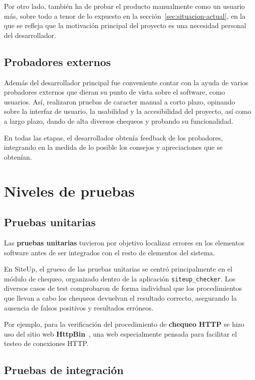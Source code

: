 Por otro lado, también ha de probar el producto manualmente como un usuario más,
sobre todo a tenor de lo expuesto en la sección~\ref{sec:situacion-actual}, en
la que se refleja que la motivación principal del proyecto es una necesidad
personal del desarrollador.

\subsection{Probadores externos}

Además del desarrollador principal fue conveniente contar con la ayuda de varios
probadores externos que dieran su punto de vista sobre el software, como
usuarios. Así, realizaron pruebas de caracter manual a corto plazo, opinando
sobre la interfaz de usuario, la usabilidad y la accesibilidad del proyecto, así
como a largo plazo, dando de alta diversos chequeos y probando su funcionalidad.

En todas las etapas, el desarrollador obtenía feedback de los probadores,
integrando en la medida de lo posible los consejos y apreciaciones que se obtenían.


\section{Niveles de pruebas}

\subsection{Pruebas unitarias}
Las \textbf{pruebas unitarias} tuvieron por objetivo localizar errores en los
elementos software antes de ser integrados con el resto de elementos del sistema.

En SiteUp, el grueso de las pruebas unitarias se centró principalmente en el
módulo de chequeo, organizado dentro de la aplicación
\texttt{siteup\_checker}. Los diversos casos de test comprobaron de forma
individual que los procedimientos que llevan a cabo los chequeos devuelvan el
resultado correcto, asegurando la ausencia de falsos positivos y resultados
erróneos.

Por ejemplo, para la verificación del procedimiento de \textbf{chequeo HTTP} se
hizo uso del sitio web \textbf{HttpBin}~\cite{httpbin}, una web especialmente
pensada para facilitar el testeo de conexiones HTTP.

\subsection{Pruebas de integración}

